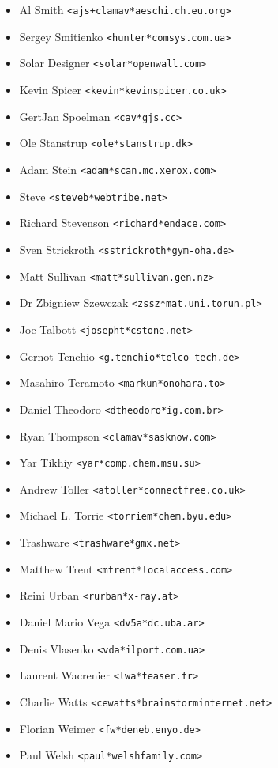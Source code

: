 \documentclass[a4paper,titlepage,12pt]{article}
\newcommand{\email}[1]{\texttt{#1}}
\begin{document}
\begin{itemize}
	\item Al Smith \email{<ajs+clamav*aeschi.ch.eu.org>}
	\item Sergey Smitienko \email{<hunter*comsys.com.ua>}
	\item Solar Designer \email{<solar*openwall.com>}
	\item Kevin Spicer \email{<kevin*kevinspicer.co.uk>}
	\item GertJan Spoelman \email{<cav*gjs.cc>}
	\item Ole Stanstrup \email{<ole*stanstrup.dk>}
	\item Adam Stein \email{<adam*scan.mc.xerox.com>}
	\item Steve \email{<steveb*webtribe.net>}
	\item Richard Stevenson \email{<richard*endace.com>}
	\item Sven Strickroth \email{<sstrickroth*gym-oha.de>}
	\item Matt Sullivan \email{<matt*sullivan.gen.nz>}
	\item Dr Zbigniew Szewczak \email{<zssz*mat.uni.torun.pl>}
	\item Joe Talbott \email{<josepht*cstone.net>}
	\item Gernot Tenchio \email{<g.tenchio*telco-tech.de>}
	\item Masahiro Teramoto \email{<markun*onohara.to>}
	\item Daniel Theodoro \email{<dtheodoro*ig.com.br>}
	\item Ryan Thompson \email{<clamav*sasknow.com>}
	\item Yar Tikhiy \email{<yar*comp.chem.msu.su>}
	\item Andrew Toller \email{<atoller*connectfree.co.uk>}
	\item Michael L. Torrie \email{<torriem*chem.byu.edu>}
	\item Trashware \email{<trashware*gmx.net>}
	\item Matthew Trent \email{<mtrent*localaccess.com>}
	\item Reini Urban \email{<rurban*x-ray.at>}
	\item Daniel Mario Vega \email{<dv5a*dc.uba.ar>}
	\item Denis Vlasenko \email{<vda*ilport.com.ua>}
	\item Laurent Wacrenier \email{<lwa*teaser.fr>}
	\item Charlie Watts \email{<cewatts*brainstorminternet.net>}
	\item Florian Weimer \email{<fw*deneb.enyo.de>}
	\item Paul Welsh \email{<paul*welshfamily.com>}

\end{itemize}
\end{document}
